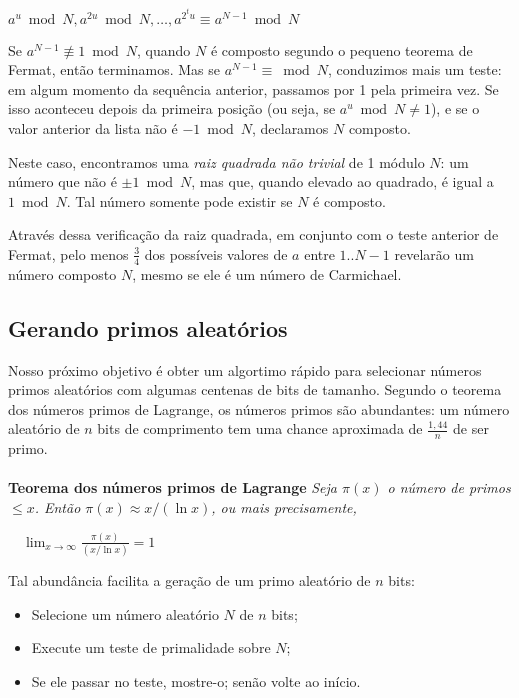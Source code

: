 $a^u\bmod N, a^{2u}\bmod N, \ldots, a^{2^tu} \equiv a^{N-1}\bmod N$

Se $a^{N-1} \not\equiv 1 \bmod N$, quando $N$ é composto segundo o pequeno
teorema de Fermat, então terminamos. Mas se $a^{N-1} \equiv \bmod N$,
conduzimos mais um teste: em algum momento da sequência anterior, passamos por
1 pela primeira vez. Se isso aconteceu depois da primeira posição (ou seja, se
$a^u \bmod N \ne 1$), e se o valor anterior da lista não é $-1 \bmod N$,
declaramos $N$ composto.

Neste caso, encontramos uma \textit{raiz quadrada não trivial} de 1 módulo
$N$: um número que não é $\pm 1\bmod N$, mas que, quando elevado ao quadrado,
é igual a $1\bmod N$. Tal número somente pode existir se $N$ é composto.

Através dessa verificação da raiz quadrada, em conjunto com o teste anterior
de Fermat, pelo menos $\frac{3}{4}$ dos possíveis valores de $a$ entre
$1..N-1$ revelarão um número composto $N$, mesmo se ele é um número de
Carmichael.


\vspace{1.5em}
\subsection*{Gerando primos aleatórios}

Nosso próximo objetivo é obter um algortimo rápido para selecionar números
primos aleatórios com algumas centenas de bits de tamanho. Segundo o teorema
dos números primos de Lagrange, os números primos são abundantes: um número
aleatório de $n$ bits de comprimento tem uma chance aproximada de
$\frac{1,44}{n}$ de ser primo.\\
\\
\textbf{Teorema dos números primos de Lagrange} \textit{Seja $\pi (x)$ o
número de primos $\leq x$. Então $\pi (x) \approx x/(\ln x)$, ou mais
precisamente,}

$\quad \lim_{x \to \infty}\frac{\pi(x)}{(x/\ln x)} = 1$

\vspace{1em}
Tal abundância facilita a geração de um primo aleatório de $n$ bits:
\begin{itemize}
  \item Selecione um número aleatório $N$ de $n$ bits;
  \item Execute um teste de primalidade sobre $N$;
  \item Se ele passar no teste, mostre-o; senão volte ao início.
\end{itemize}

